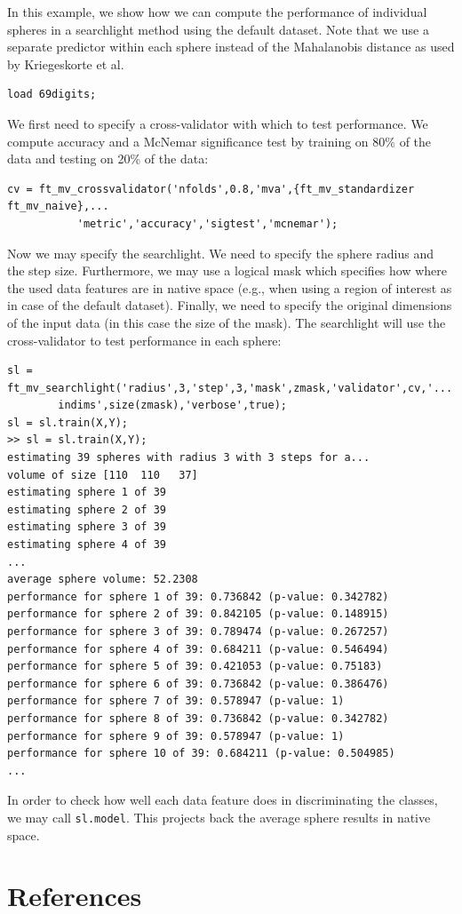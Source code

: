 \documentclass{article}
\renewcommand{\t}[1]{{\tt #1}}
\begin{document}
In this example, we show how we can compute the performance of individual spheres in a searchlight method using the default dataset. Note that we use a separate predictor within each sphere instead of the Mahalanobis distance as used by Kriegeskorte et al.
\begin{verbatim}
load 69digits;
\end{verbatim}
We first need to specify a cross-validator with which to test performance. We compute accuracy and a McNemar significance test by training on 80\% of the data and testing on 20\% of the data:
\begin{verbatim}
cv = ft_mv_crossvalidator('nfolds',0.8,'mva',{ft_mv_standardizer ft_mv_naive},...
           'metric','accuracy','sigtest','mcnemar');
\end{verbatim}
Now we may specify the searchlight. We need to specify the sphere radius and the step size. Furthermore, we may use a logical mask which specifies how where the used data features are in native space (e.g., when using a region of interest as in case of the default dataset). Finally, we need to specify the original dimensions of the input data (in this case the size of the mask). The searchlight will use the cross-validator to test performance in each sphere:
\begin{verbatim}
sl = ft_mv_searchlight('radius',3,'step',3,'mask',zmask,'validator',cv,'...
        indims',size(zmask),'verbose',true);
sl = sl.train(X,Y);
>> sl = sl.train(X,Y);
estimating 39 spheres with radius 3 with 3 steps for a...
volume of size [110  110   37]
estimating sphere 1 of 39
estimating sphere 2 of 39
estimating sphere 3 of 39
estimating sphere 4 of 39
...
average sphere volume: 52.2308
performance for sphere 1 of 39: 0.736842 (p-value: 0.342782)
performance for sphere 2 of 39: 0.842105 (p-value: 0.148915)
performance for sphere 3 of 39: 0.789474 (p-value: 0.267257)
performance for sphere 4 of 39: 0.684211 (p-value: 0.546494)
performance for sphere 5 of 39: 0.421053 (p-value: 0.75183)
performance for sphere 6 of 39: 0.736842 (p-value: 0.386476)
performance for sphere 7 of 39: 0.578947 (p-value: 1)
performance for sphere 8 of 39: 0.736842 (p-value: 0.342782)
performance for sphere 9 of 39: 0.578947 (p-value: 1)
performance for sphere 10 of 39: 0.684211 (p-value: 0.504985)
...
\end{verbatim}
In order to check how well each data feature  does in discriminating the classes, we may call \t{sl.model}. This projects back the average sphere results in native space.


\newpage

\section{References}


\def\refname{}

\end{document}
